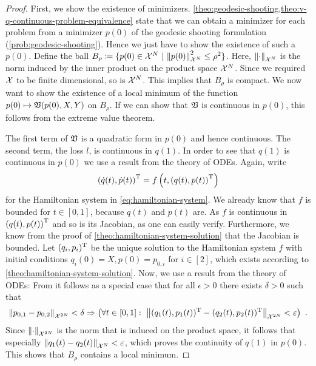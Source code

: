 \begin{proof}
	First, we show the existence of minimizers.
	\cref{theo:geodesic-shooting,theo:v-q-continuous-problem-equivalence} state that we can obtain a minimizer for each problem from a minimizer $p(0)$ of the geodesic shooting formulation (\cref{prob:geodesic-shooting}).
	Hence we just have to show the existence of such a $p(0)$.
	Define the ball $B_\rho \coloneqq \{p(0) \in \mathcal{X}^N\ | \ \norm{p(0)}_{\mathcal{X}^N}^2 \leq \rho^2 \}$. Here, $\norm{\cdot}_{\mathcal{X}^N}$ is the norm induced by the inner product on the product space $\mathcal{X}^N$.
	Since we required $\mathcal{X}$ to be finite dimensional, so is $\mathcal{X}^N$.
	This implies that $B_\rho$ is compact.
	We now want to show the existence of a local minimum of the function $p(0) \mapsto \mathfrak{V}(p(0), X, Y)$ on $B_\rho$.
	If we can show that $\mathfrak{V}$ is continuous in $p(0)$, this follows from the extreme value theorem.
	
	The first term of $\mathfrak{V}$ is a quadratic form in $p(0)$ and hence continuous.
	The second term, the loss $l$, is continuous in $q(1)$.
	In order to see that $q(1)$ is continuous in $p(0)$ we use a result from the theory of ODEs.
	Again, write
	\begin{equation}
	\left(\dot{q}(t), \dot{p}(t)\right)^{\mathrm{T}} = f\left(t, \left(q(t), p(t)\right)^{\mathrm{T}} \right)
	\end{equation}
	for the Hamiltonian system in \cref{eq:hamiltonian-system}.
	We already know that $f$ is bounded for $t \in [0, 1]$, because $q(t)$ and $p(t)$ are.
	As $f$ is continuous in $\left(q(t), p(t)\right)^{\mathrm{T}}$ and so is its Jacobian, as one can easily verify.
	Furthermore, we know from the proof of \cref{theo:hamiltonian-system-solution} that the Jacobian is bounded.
	Let $(q_i, p_i)^{\mathrm{T}}$ be the unique solution to the Hamiltonian system $f$ with initial conditions $q_i(0) = X, p(0) = p_{0, i}$ for $i \in [2]$, which exists according to \cref{theo:hamiltonian-system-solution}.
	Now, we use a result from the theory of ODEs:
	From \cite[Theorem~1.4.1]{arino06} it follows as a special case that for all $\epsilon > 0$ there exists $\delta > 0$ such that
	\begin{equation}
	\norm{p_{0, 1} - p_{0, 2}}_{\mathcal{X}^{2N}} < \delta \Rightarrow 
	\left(\forall t \in [0, 1]:\ \norm{(q_1(t), p_1(t))^{\mathrm{T}} - (q_2(t), p_2(t))^{\mathrm{T}}}_{\mathcal{X}^{2N}} < \varepsilon \right) \ .
	\end{equation}
	Since $\norm{\cdot}_{\mathcal{X}^{2N}}$ is the norm that is induced on the product space, it follows that especially $\norm{q_1(t) - q_2(t)}_{\mathcal{X}^N} < \varepsilon$, which proves the continuity of $q(1)$ in $p(0)$.
	This shows that $B_\rho$ contains a local minimum.
	

\end{proof}
